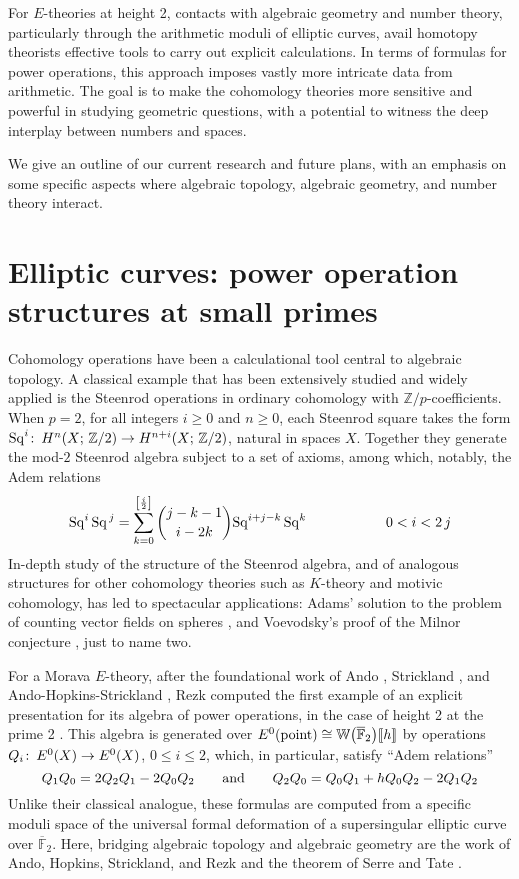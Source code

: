 \documentclass{rs}
\theoremstyle{definition}
\theoremstyle{remark}
\def\co{\colon\thinspace}
\newcommand{\mb}[1]{\mathbb{#1}}
\newcommand{\cF}{\overline {\mb F}}
\newcommand{\Sq}{{\rm Sq}}
\newcommand{\BW}{{\mb W}}
\newcommand{\BZ}{{\mb Z}}
\newcommand{\ad}{{\rm and}}
\newcommand{\pt}{{\rm point}}
\newcommand{\lb}{\llbracket}
\newcommand{\rb}{\rrbracket}
\renewcommand{\=}{\approx}
\renewcommand{\-}{\sim}
\renewcommand{\c}[2]{{#1 \choose #2}}
\numberwithin{equation}{section}
\begin{document}
For $E$-theories at height 2, contacts with algebraic geometry and number 
theory, particularly through the arithmetic moduli of elliptic curves, avail 
homotopy theorists effective tools to carry out explicit calculations.  In terms 
of formulas for power operations, this approach imposes vastly more intricate 
data from arithmetic.  The goal is to make the cohomology theories more 
sensitive and powerful in studying geometric questions, with a potential to 
witness the deep interplay between numbers and spaces.  

We give an outline of our current research and future plans, with an emphasis on 
some specific aspects where algebraic topology, algebraic geometry, and number 
theory interact.  



\section{Elliptic curves: power operation structures at small primes}
\label{sec:p3}

Cohomology operations have been a calculational tool central to algebraic 
topology.  A classical example that has been extensively studied and widely 
applied is the Steenrod operations in ordinary cohomology with 
$\BZ/p$-coefficients.  When $p = 2$, for all integers $i \geq 0$ and $n \geq 0$, 
each Steenrod square takes the form 
$\Sq^i \co H^n(X;\,\BZ/2) \to H^{n + i}(X;\,\BZ/2)$, natural in spaces $X$.  
Together they generate the mod-$2$ Steenrod algebra subject to a set of axioms, 
among which, notably, the Adem relations 
\[
 \Sq^i\,\Sq^{\,j} = \sum_{k = 0}^{\left[\frac{i}{2}\right]} 
                    \c{j - k - 1}{i - 2 k} \Sq^{i + j - k}\,\Sq^k 
 \hskip 2cm 0 < i < 2\,j 
\]
In-depth study of the structure of the Steenrod algebra, and of analogous 
structures for other cohomology theories such as $K$-theory and motivic 
cohomology, has led to spectacular applications: Adams' solution to the problem 
of counting vector fields on spheres \cite{Adams}, and Voevodsky's proof of the 
Milnor conjecture \cite{V1, V2}, just to name two.  

For a Morava $E$-theory, after the foundational work of Ando \cite{Ando95}, 
Strickland \cite{Str97, Str98}, and Ando-Hopkins-Strickland \cite{AHS04}, Rezk 
computed the first example of an explicit presentation for its algebra of power 
operations, in the case of height 2 at the prime 2 \cite{h2p2}.  This algebra is 
generated over $E^0(\pt) \cong \BW\big(\cF_2\big)\lb h \rb$ by operations 
$Q_i \co E^0(X) \to E^0(X)$, $0 \leq i \leq 2$, which, in particular, satisfy 
``Adem relations'' 
\[
  Q_1 Q_0 = 2 Q_2 Q_1 - 2 Q_0 Q_2 \qquad \ad \qquad 
  Q_2 Q_0 = Q_0 Q_1 + h Q_0 Q_2 - 2 Q_1 Q_2 
\]
Unlike their classical analogue, these formulas are computed from a specific 
moduli space of the universal formal deformation of a supersingular elliptic 
curve over $\cF_2$.  Here, bridging algebraic topology and algebraic geometry 
are the work of Ando, Hopkins, Strickland, and Rezk \cite{AHS04, cong} and the 
theorem of Serre and Tate \cite{LST}.  
\end{document}
